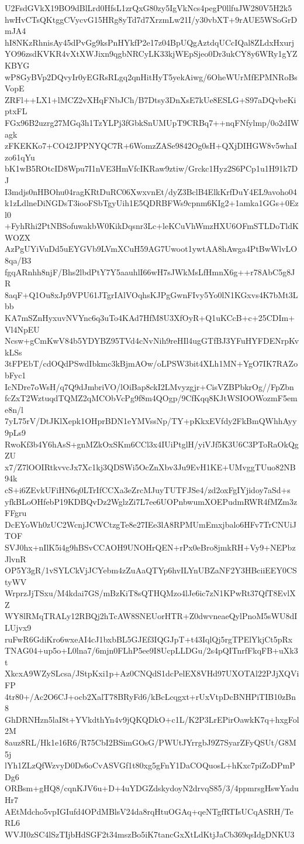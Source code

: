 U2FsdGVkX19BO9dBlLrd0HfsL1zrQxG80zy5IgVkNcs4pegP0llfuJW280V5H2k5
hwHvCTsQKtggCVycvG15HRg8yTd7d7XrzmLw21I/y30vbXT+9rAUE5WSoGrDmJA4
hI8NKzRhnisAy45dPvGg9ksPnHYkfP2e17z04BpUQgAztdqUCcIQal8ZLdxHxurj
YO96zsdKVKR4vXtXWJixn9qgbNRCyLK33kjWEpSjeo0Dr3ukCY8y6WRy1gYZKBYG
wP8GyBVp2DQvyIr0yEGRsRLgq2qnHitHyT5yekAiwg/6OheWUrMfEPMNRoBsVopE
ZRFl++LX1+lMCZ2vXHqFNbJCh/B7Dtsy3DnXsE7kUe8ESLG+S97aDQvbeKiptxFL
FGx96B2uzrg27MGq3h1TzYLPj3fGbkSnUMUpT9CRBq7++nqFNfylmp/0o2dIWagk
zFKEKKo7+CO42JPPNYQC7R+6WomzZASe9842Og0sH+QXjDIHGW8v5whaIzo61qYu
bK1wB5ROtcID8Wpu7I1nVE3HmVfcIKRaw9ztiw/Grckc1Hyz2S6PCp1u1H91k7DJ
I3mdjs0nHBOhu04ragKRtDuRC06XwxvnEt/dyZ3BclB4ElkKrfDuY4EL9avoho04
k1zLdlneDiNGDsT3iooFSbTgyUih1E5QDRBFWs9cpnm6KIg2+1amka1GGs+0Ezl0
+FyhRhi2PtNBSofuwakbW0KikDqsnr3Lc+leKCuVhWmzHXU6OFmSTLDoTldKWOZX
AzPgUYiVuDd5uEYGVb9LVmXCuH59AG7Uwoot1ywtAA8hAwga4PtBwWlvLO8qa/B3
fgqARnhh8njF/Bhs2lbdPtY7Y5aauhlI66wH7sJWkMsLfHmnX6g++r78AbC5g8JR
8aqF+Q1Ou8xJp9VPU61JTgrIAlVOqhsKJPgGwnFIvy5Yo0lN1KGxvs4K7bMt3Lbb
KA7mSZnHyxuvNVYnc6q3uTo4KAd7HfM8U3XfOyR+Q1uKCcB+c+25CDIm+Vl4NpEU
Ncsw+gCmKwV84b5YDYBZ95TVd4cNvNih9reHIl4ugGTfBJ3YFuHYFDENrpKvkLSs
3tFPEbT/cdOQdPSwdIbkmc3kBjmAOw/oLPSW3bit4XLh1MN+YgO7IK7RAZobFyc1
IcNDre7oWsH/q7Q9dJmbriVO/lOiBap8ckI2LMvyzgjr+CisVZBPbkrOg//FpZbn
fcZxT2WztuqdTQMZ2qMCObVcPg9f8m4QOgp/9CfKqq8KJtWSIOOWozmF5eme8n/l
7yL75rV/DtJKlXepk1OHprBDN1eYMVssNp/TY+pKkxEVfdy2FkBmQWhhAyy9pLs9
RwoKf3b4Y6hAsS+gnMZkOxSKm6CCl3x4IUiPtglH/yiVJf5K3U6C3PToRaOkQgZU
x7/Z7lOOIRtkvvcJx7Xc1kj3QDSWi5OcZnXbv3Ju9EvH1KE+UMvggTUuo82NB94k
cS+i6ZEvkUFiHN6q0LTrIfCCXa3eZrcMJuyTUTFJSe4/zd2oxFgIYjidoy7aSd+s
yfkBLoOHfebP19KDBQvDz2WglzZi7L7ee6UOPnbwumXOEPudmRWR4fMZm3zFFgru
DcEYoWh0zUC2WcnjJCWCtzgTe8e27IEe3lA8RPMUmEmxjbalo6HFv7TrCNUiJTOF
SVJ0hx+nIlK5i4g9hBSvCCAOH9UNOHrQEN+rPx0eBro8jmkRH+Vy9+NEPbzJlvnR
OP5Y3gR/1vSYLCkVjJCYebm4zZuAaQTYp6hvILYnUBZaNF2Y3HBciiEEY0CStyWV
WrprzJjTSxu/M4kdai7GS/mBzKiT8sQTHQMzo4lJe6ic7zN1KPwRt37QfT8EvlXZ
WY8lRMqTRALy12RBQj2hTcAW8SNEUorHTR+Z0dwvneaeQylPnoM5sWU8dILUjvx9
ruFwR6GdiKro6wxeAI4cJ1bxbBL5GJEf3IQGJpT+t43IqlQj5rgTPElYkjCt5pRx
TNAG04+up5o+L0lna7/6mjn0FLhP5ee9I8UcpLLDGu/2s4pQITnrfFkqFB+uXk3t
XkcxA9WZySLcsa/JStpKxi1p+Az0CNQdS1dcPelEX8VHd97UXOTAl22PJjXQViFP
4tr80+/Ac2O6CJ+ocb2XalT78BRyFd6/kBcLcqgxt+rUxVtpDcBNHPiTIB10zBn8
GhDRNHzn5laI8t+YVkdthYn4v9jQKQDkO+c1L/K2P3LrEPirOawkK7q+hxgFol2M
8auz8RL/Hk1e16R6/R75CbI2BSimGOsG/PWUtJYrrgbJ9Z7SyarZFyQSUt/G8M5j
lYh1ZLzQfWzvyD0Ds6oCvASVGf1t80xg5gFnY1DaCOQuosL+hKxc7piZoDPmPDg6
ORBsm+gHQ8/cqnKJV6u+D+4uYDGZdskydoyN2drvqS85/3/4ppmrsgHswYaduHr7
AEtMdcho5vpIGIufd4OPdMBlsV24da8rqHtuOGAq+qeNTgfRTIsUCqASRH/TeRL6
WVJI0zSC4lSzTIjbHdSGF2t34mszBo5iK7tancGxXtLdKtjJaCb369qsIdgDNKU3
